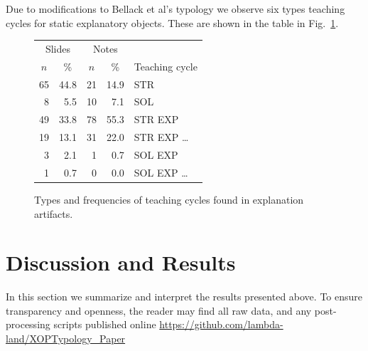 \documentclass[conference]{IEEEtran}
\begin{document}
Due to modifications to Bellack et al's typology we observe six types
teaching cycles for static explanatory objects. These are shown in the table in
Fig.~\ref{fig:cycles-table}.


\newcommand{\Freq}[1]{\ensuremath{\text{Freq}_\text{#1}}}

\begin{figure}
\centering\footnotesize
\begin{tabular}{rr|rr|l}
\multicolumn{2}{c}{Slides} &
\multicolumn{2}{c}{Notes} & \\
\multicolumn{1}{c}{$n$} & \multicolumn{1}{c}{\%} &
\multicolumn{1}{c}{$n$} & \multicolumn{1}{c}{\%}
  & \multicolumn{1}{l}{Teaching cycle} \\ \hline
65 & 44.8 & 21 & 14.9 & STR \\
 8 &  5.5 & 10 &  7.1 & SOL \\
49 & 33.8 & 78 & 55.3 & STR EXP \\
19 & 13.1 & 31 & 22.0 & STR EXP \ldots \\
 3 &  2.1 &  1 &  0.7 & SOL EXP \\
 1 &  0.7 &  0 &  0.0 & SOL EXP \ldots \\
\end{tabular}
\caption{Types and frequencies of teaching cycles found in explanation artifacts.}
\label{fig:cycles-table}
\end{figure}

\section{Discussion and Results}
In this section we summarize and interpret the results presented above. To
ensure transparency and openness, the reader may find all raw data, and any
post-processing scripts published online \url{https://github.com/lambda-land/XOPTypology_Paper}
\end{document}
